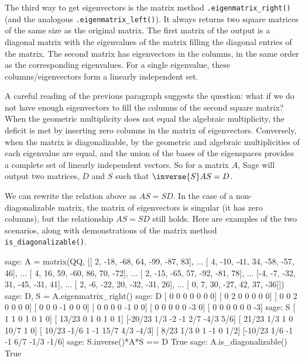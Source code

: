 The third way to get eigenvectors is the matrix method \verb!.eigenmatrix_right()! (and the analogous \verb!.eigenmatrix_left()!).  It always returns two square matrices of the same size as the original matrix.  The first matrix of the output is a diagonal matrix with the eigenvalues of the matrix filling the diagonal entries of the matrix.  The second matrix has eigenvectors in the columns, in the same order as the corresponding eigenvalues.  For a single eigenvalue, these columns/eigenvectors form a linearly independent set.\par
%
A careful reading of the previous paragraph suggests the question:  what if we do not have enough eigenvectors to fill the columns of the second square matrix?  When the geometric multiplicity does not equal the algebraic multiplicity, the deficit is met by inserting zero columns in the matrix of eigenvectors.  Conversely, when the matrix is diagonalizable, by  the geometric and algebraic multiplicities of each eigenvalue are equal, and the union of the bases of the eigenspaces provides a complete set of linearly independent vectors.  So for a matrix $A$, Sage will output two matrices, $D$ and $S$ such that $\inverse{S}AS=D$.\par
%
We can rewrite the relation above as $AS=SD$.  In the case of a non-diagonalizable matrix, the matrix of eigenvectors is singular (it has zero columns), but the relationship $AS=SD$ still holds.  Here are examples of the two scenarios, along with demonstrations of the matrix method \verb?is_diagonalizable()?.
%
\begin{sageexample}
sage: A = matrix(QQ, [[ 2, -18, -68,  64, -99, -87,  83],
...                   [ 4, -10, -41,  34, -58, -57,  46],
...                   [ 4,  16,  59, -60,  86,  70, -72],
...                   [ 2, -15, -65,  57, -92, -81,  78],
...                   [-4,  -7, -32,  31, -45, -31,  41],
...                   [ 2,  -6, -22,  20, -32, -31,  26],
...                   [ 0,   7,  30, -27,  42,  37, -36]])
sage: D, S = A.eigenmatrix_right()
sage: D
[ 0  0  0  0  0  0  0]
[ 0  2  0  0  0  0  0]
[ 0  0  2  0  0  0  0]
[ 0  0  0 -1  0  0  0]
[ 0  0  0  0 -1  0  0]
[ 0  0  0  0  0 -3  0]
[ 0  0  0  0  0  0 -3]
sage: S
[     1      1      0      1      0      1      0]
[ 13/23      0      1      0      1      0      1]
[-20/23    1/3     -2     -1    2/7   -4/3    5/6]
[ 21/23    1/3      1      0   10/7      1      0]
[ 10/23   -1/6      1     -1   15/7    4/3   -4/3]
[  8/23    1/3      0      1     -1      0    1/2]
[-10/23    1/6     -1     -1    6/7   -1/3   -1/6]
sage: S.inverse()*A*S == D
True
sage: A.is_diagonalizable()
True
\end{sageexample}
